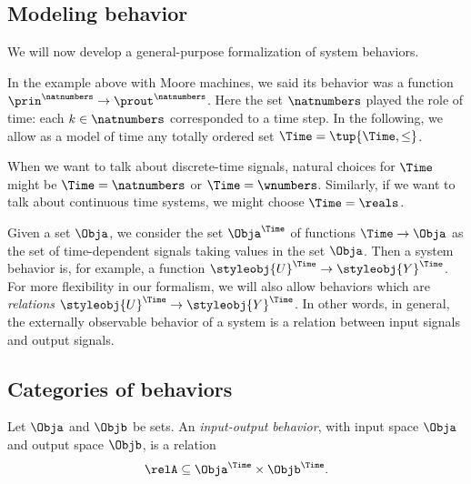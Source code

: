 \subsection{Modeling behavior}

We will now develop a general-purpose formalization of system behaviors. 


In the example above with Moore machines, we said its behavior was a function $\prin^\natnumbers \to \prout^\natnumbers$. Here the set $\natnumbers$ played the role of time: each $k \in \natnumbers$ corresponded to a time step. In the following, we allow as a model of time any totally ordered set $\Time = \tup{\Time, \leq}$. 

When we want to talk about discrete-time signals, natural choices for $\Time$ might be $\Time = \natnumbers$ or $\Time = \wnumbers$. Similarly, if we want to talk about continuous time systems, we might choose $\Time = \reals$.


Given a set $\Obja$, we consider the set $\Obja^\Time$ of functions $\Time \to \Obja$ as the set of time-dependent signals taking values in the set $\Obja$. Then a system behavior is, for example, a function $\styleobj{U}^\Time \to \styleobj{Y}^\Time$. For more flexibility in our formalism, we will also allow behaviors which are \emph{relations} $\styleobj{U}^\Time \to \styleobj{Y}^\Time$. 
In other words, in general, the externally observable behavior of a system is a relation between input signals and output signals.



\subsection{Categories of behaviors}

 
\begin{definition}
    Let $\Obja$ and $\Objb$ be sets.
    An \emph{input-output behavior}, with input space $\Obja$ and output space $\Objb$, is a relation
    \begin{equation}
        \relA \subseteq \Obja^\Time \times \Objb^\Time.
    \end{equation}
\end{definition}


